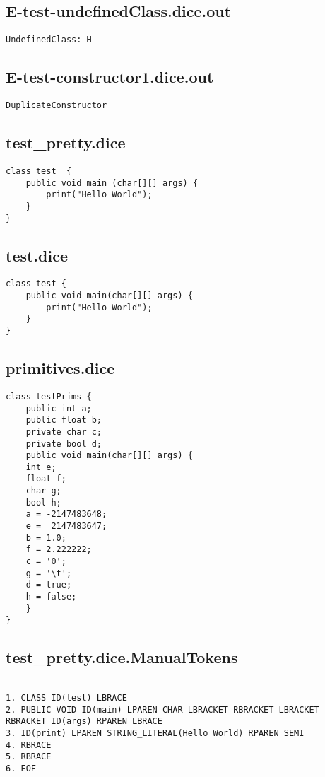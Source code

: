 \subsection{E-test-undefinedClass.dice.out}
\begin{verbatim}
UndefinedClass: H

\end{verbatim}
\pagebreak
\subsection{E-test-constructor1.dice.out}
\begin{verbatim}
DuplicateConstructor 

\end{verbatim}
\pagebreak
\subsection{test_pretty.dice}
\begin{verbatim}
class test  {
	public void main (char[][] args) {
		print("Hello World");
	}
}

\end{verbatim}
\pagebreak
\subsection{test.dice}
\begin{verbatim}
class test {
	public void main(char[][] args) {
		print("Hello World");
	}
}
\end{verbatim}
\pagebreak
\subsection{primitives.dice}
\begin{verbatim}
class testPrims {
	public int a;
	public float b;
	private char c;
	private bool d;
	public void main(char[][] args) {
	int e;
	float f;
	char g;
	bool h;
	a = -2147483648;
	e =  2147483647;
	b = 1.0;
	f = 2.222222;
	c = '0';
	g = '\t';
	d = true;
	h = false;
	}
}
\end{verbatim}
\pagebreak
\subsection{test_pretty.dice.ManualTokens}
\begin{verbatim}

1. CLASS ID(test) LBRACE
2. PUBLIC VOID ID(main) LPAREN CHAR LBRACKET RBRACKET LBRACKET RBRACKET ID(args) RPAREN LBRACE
3. ID(print) LPAREN STRING_LITERAL(Hello World) RPAREN SEMI
4. RBRACE
5. RBRACE
6. EOF

\end{verbatim}
\pagebreak
